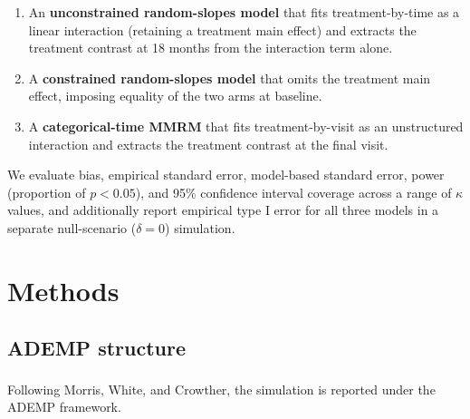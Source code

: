 \documentclass[
  11pt,
]{article}
\providecommand{\tightlist}{%
  \setlength{\itemsep}{0pt}\setlength{\parskip}{0pt}}
\begin{document}
\begin{enumerate}
\def\labelenumi{\arabic{enumi}.}
\tightlist
\item
  An \textbf{unconstrained random-slopes model} that fits
  treatment-by-time as a linear interaction (retaining a
  treatment main effect) and extracts the treatment contrast
  at 18 months from the interaction term alone.
\item
  A \textbf{constrained random-slopes model} that omits the
  treatment main effect, imposing equality of the two arms at
  baseline.
\item
  A \textbf{categorical-time MMRM} that fits treatment-by-visit
  as an unstructured interaction and extracts the treatment
  contrast at the final visit.
\end{enumerate}

We evaluate bias, empirical standard error, model-based
standard error, power (proportion of \(p < 0.05\)), and 95\%
confidence interval coverage across a range of \(\kappa\)
values, and additionally report empirical type I error for all
three models in a separate null-scenario (\(\delta = 0\))
simulation.

\section{Methods}\label{methods}

\subsection{ADEMP structure}\label{ademp-structure}

Following Morris, White, and Crowther\textsuperscript{}, the
simulation is reported under the ADEMP framework.
\end{document}
